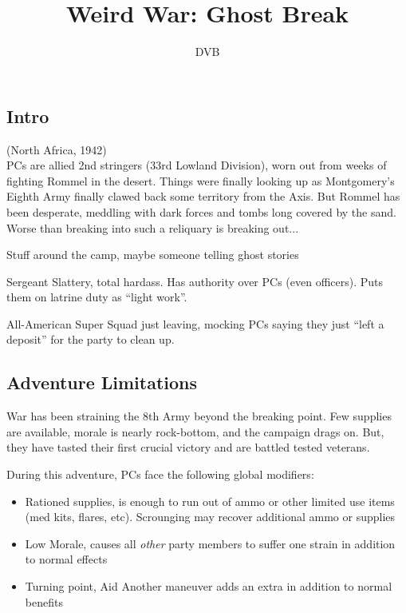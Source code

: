 \documentclass{book}
\title{Weird War: Ghost Break}
\author{DVB}
\begin{document}
\maketitle

\begin{multicols}{2}
\section{Intro}
(North Africa, 1942)\\

    PCs are allied 2nd stringers (33rd Lowland Division), worn out from weeks of fighting Rommel in the desert.  Things were finally looking up as Montgomery's Eighth Army finally clawed back some territory from the Axis.  But Rommel has been desperate, meddling with dark forces and tombs long covered by the sand.  Worse than breaking into such a reliquary is breaking out...

Stuff around the camp, maybe someone telling ghost stories

    Sergeant Slattery, total hardass.  Has authority over PCs (even officers).  Puts them on latrine duty as ``light work''.

All-American Super Squad just leaving, mocking PCs saying they just ``left a deposit'' for the party to clean up.

\subsection{Adventure Limitations}

    War has been straining the 8th Army beyond the breaking point.  Few supplies are available, morale is nearly rock-bottom, and the campaign drags on.  But, they have tasted their first crucial victory and are battled tested veterans.
    
    During this adventure, PCs face the following global modifiers:

    \begin{itemize}
        \item Rationed supplies, \Threat\Threat is enough to run out of ammo or other limited use items (med kits, flares, etc).  Scrounging may recover additional ammo or supplies
        \item Low Morale, \Despair causes all \emph{other} party members to suffer one strain in addition to normal effects
        \item Turning point, Aid Another maneuver adds an extra \Advantage\Advantage in addition to normal benefits
    \end{itemize}


\end{multicols}
\end{document}
